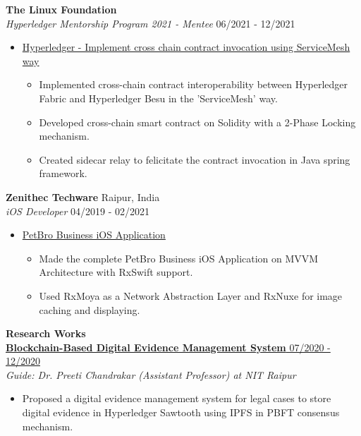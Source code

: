 \documentclass{article}
\begin{document}
\noindent \normalsize \textbf{The Linux Foundation} \\
\textit{Hyperledger Mentorship Program 2021 - Mentee} \hfill 06/2021 - 12/2021
\begin{itemize}[noitemsep,nolistsep,leftmargin=*]
    \item {\normalsize \href{https://wiki.hyperledger.org/display/INTERN/Implement+cross+chain+contract+invocation+using+ServiceMesh+way}{Hyperledger - Implement cross chain contract invocation using ServiceMesh way}
        \begin{itemize}
            \item Implemented cross-chain contract interoperability between Hyperledger Fabric and Hyperledger Besu in the 'ServiceMesh' way.
            \item Developed cross-chain smart contract on Solidity with a 2-Phase Locking mechanism.
            \item Created sidecar relay to felicitate the contract invocation in Java spring framework.
        \end{itemize}
    }
\end{itemize}

\noindent \normalsize \textbf{Zenithec Techware} \hfill Raipur, India  \\
\textit{iOS Developer} \hfill 04/2019 - 02/2021
\begin{itemize}[noitemsep,nolistsep,leftmargin=*]
    \item {\normalsize \href{https://apple.co/3kAiLJ0}{PetBro Business iOS Application}
        \begin{itemize}
            \item Made the complete PetBro Business iOS Application on MVVM Architecture with RxSwift support.
            \item Used RxMoya as a Network Abstraction Layer and RxNuxe for image caching and displaying.
        \end{itemize}
    }
\end{itemize}

\noindent \large \textbf{\textcolor{NavyBlue}{Research Works}} \vspace{3pt} \\
\noindent \normalsize \href{https://link.springer.com/content/pdf/10.1007/978-3-030-82469-3_30}{\textbf{Blockchain-Based Digital Evidence Management System } \hfill 07/2020 - 12/2020} \\
\textit{Guide: Dr. Preeti Chandrakar (Assistant Professor) at NIT Raipur} \hfill
\begin{itemize}
    \item Proposed a digital evidence management system for legal cases to store digital evidence in Hyperledger Sawtooth using IPFS in PBFT consensus mechanism.
\end{itemize}
\end{document}
